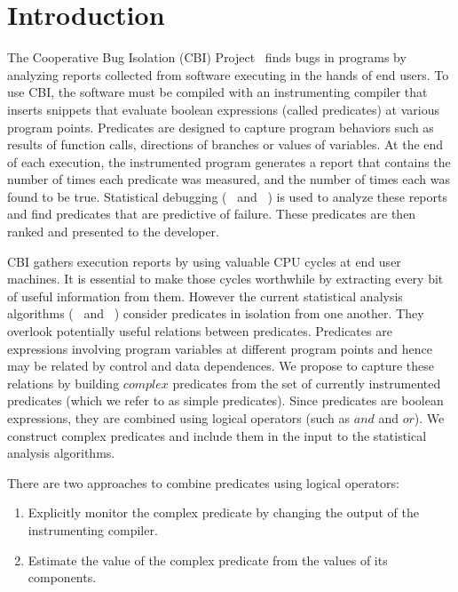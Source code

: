 
\section{Introduction}

The Cooperative Bug Isolation (CBI) Project~\cite{Liblit:2004:CBI} finds bugs in programs by analyzing reports collected from software executing in the hands of end users.  To use CBI, the software must be compiled with an instrumenting compiler that inserts snippets that evaluate boolean expressions (called predicates) at various program points.  Predicates are designed to capture program behaviors such as results of function calls, directions of branches or values of variables.  At the end of each execution, the instrumented program generates a report that contains the number of times each predicate was measured, and the number of times each was found to be true.  Statistical debugging (~\cite{Liblit:2005:SSBI} and ~\cite{Zheng:2006:SDSIMB}) is used to analyze these reports and find predicates that are predictive of failure.  These predicates are then ranked and presented to the developer.

CBI gathers execution reports by using valuable CPU cycles at end user machines.  It is essential to make those cycles worthwhile by extracting every bit of useful information from them.  However the current statistical analysis algorithms (~\cite{Liblit:2005:SSBI} and ~\cite{Zheng:2006:SDSIMB}) consider predicates in isolation from one another.  They overlook potentially useful relations between predicates.  Predicates are expressions involving program variables at different program points and hence may be related by control and data dependences.  We propose to capture these relations by building $complex$ predicates from the set of currently instrumented predicates (which we refer to as simple predicates).  Since predicates are boolean expressions, they are combined using logical operators (such as $and$ and $or$).  We construct complex predicates and include them in the input to the statistical analysis algorithms.

There are two approaches to combine predicates using logical operators:
\begin{enumerate}
\item Explicitly monitor the complex predicate by changing the output of the instrumenting compiler.
\item Estimate the value of the complex predicate from the values of its components.
\end{enumerate}

